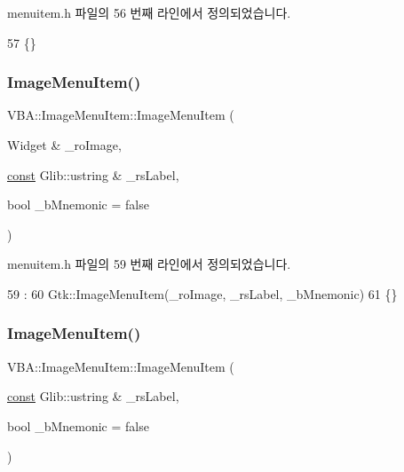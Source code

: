 menuitem.\+h 파일의 56 번째 라인에서 정의되었습니다.


\begin{DoxyCode}
57     \{\}
\end{DoxyCode}
\mbox{\label{class_v_b_a_1_1_image_menu_item_a52aaf1e5ccc5520a9136f113ee69c47b}} 
\subsubsection{\texorpdfstring{Image\+Menu\+Item()}{ImageMenuItem()}\hspace{0.1cm}{\footnotesize\ttfamily [2/4]}}
{\footnotesize\ttfamily V\+B\+A\+::\+Image\+Menu\+Item\+::\+Image\+Menu\+Item (\begin{DoxyParamCaption}\item[{Widget \&}]{\+\_\+ro\+Image,  }\item[{\mbox{\hyperlink{getopt1_8c_a2c212835823e3c54a8ab6d95c652660e}{const}} Glib\+::ustring \&}]{\+\_\+rs\+Label,  }\item[{bool}]{\+\_\+b\+Mnemonic = {\ttfamily false} }\end{DoxyParamCaption})\hspace{0.3cm}{\ttfamily [inline]}}



menuitem.\+h 파일의 59 번째 라인에서 정의되었습니다.


\begin{DoxyCode}
59                                                                                           :
60     Gtk::ImageMenuItem(\_roImage, \_rsLabel, \_bMnemonic)
61     \{\}
\end{DoxyCode}
\mbox{\label{class_v_b_a_1_1_image_menu_item_a3cc1d64f1275f7e31c6cf1d48a21c070}} 
\subsubsection{\texorpdfstring{Image\+Menu\+Item()}{ImageMenuItem()}\hspace{0.1cm}{\footnotesize\ttfamily [3/4]}}
{\footnotesize\ttfamily V\+B\+A\+::\+Image\+Menu\+Item\+::\+Image\+Menu\+Item (\begin{DoxyParamCaption}\item[{\mbox{\hyperlink{getopt1_8c_a2c212835823e3c54a8ab6d95c652660e}{const}} Glib\+::ustring \&}]{\+\_\+rs\+Label,  }\item[{bool}]{\+\_\+b\+Mnemonic = {\ttfamily false} }\end{DoxyParamCaption})\hspace{0.3cm}{\ttfamily [inline]}}



